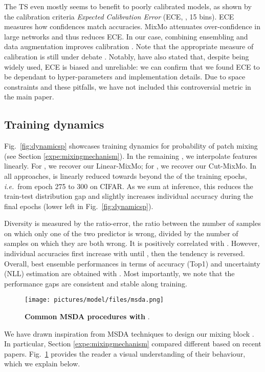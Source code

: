 \documentclass[10pt,twocolumn,letterpaper]{article}
\begin{document}
The TS even mostly seems to benefit to poorly calibrated models, as shown by the calibration criteria \textit{Expected Calibration Error} (ECE, , 15 bins). ECE measures how confidences match accuracies. MixMo attenuates over-confidence in large networks and thus reduces ECE. In our case, combining ensembling and data augmentation improves calibration \cite{wen2021combining}.
Note that the appropriate measure of calibration is still under debate \cite{nixon2019measuring,NEURIPS2019_1c336b80,zhang2020mix}. 
Notably, \cite{ashukha2020pitfalls} have also stated that, despite being widely used, ECE is biased and unreliable: we can confirm that we found ECE to be dependant to hyper-parameters and implementation details. Due to space constraints and these pitfalls, we have not included this controversial metric in the main paper.
%
 \subsection{Training dynamics}
\label{app:td}

Fig.~\ref{fig:dynamicsp} showcases training dynamics for probability 
of patch mixing (see Section \ref{expe:mixingmechanism}). In the remaining , we interpolate features linearly. For , we recover our Linear-MixMo; for , we recover our Cut-MixMo. In all approaches,  is linearly reduced towards  beyond the  of the training epochs, \textit{i.e.}\ from epoch 275 to 300 on CIFAR. As we sum at inference, this reduces the train-test distribution gap and slightly increases individual accuracy during the final epochs (lower left in Fig.~\ref{fig:dynamicsp}).

Diversity is measured by the ratio-error, the ratio between the number of samples on which only one of the two predictor is wrong, divided by the number of samples on which they are both wrong. It is positively correlated with . However, individual accuracies first increase
with  until , then the tendency is reversed.
Overall, best ensemble performances in terms of accuracy (Top1) and uncertainty (NLL)
estimation are obtained with . Most importantly, we note that the performance gaps are consistent and stable along training. \begin{figure}[!b]\texttt{[image: pictures/model/files/msda.png]}\caption{\textbf{Common MSDA procedures with }.}\label{fig:msda}\end{figure}%
\label{app:msda}
We have drawn inspiration from MSDA techniques to design our mixing block
. In particular, Section \ref{expe:mixingmechanism} compared
different  based on recent papers. Fig.~\ref{fig:msda}
provides the reader a visual understanding of their behaviour, which we explain
below.
\end{document}
